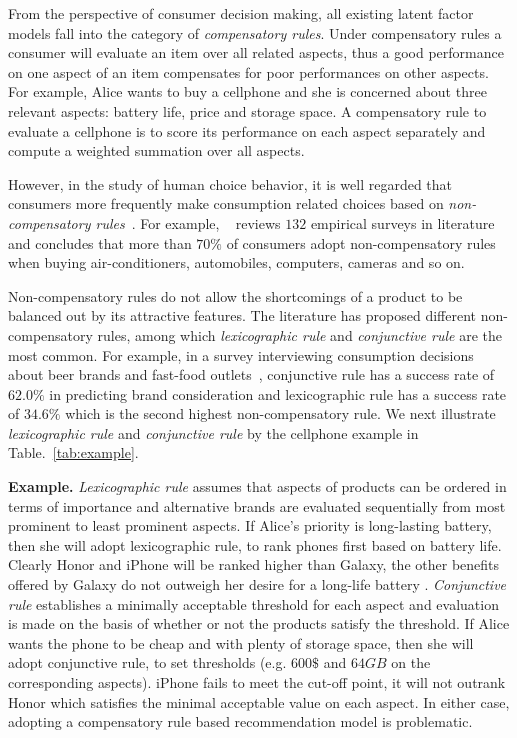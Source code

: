 \documentclass[letterpaper]{article} %
\begin{document}
From the perspective of consumer decision making, all existing latent factor models fall into the category of \emph{compensatory rules}. Under compensatory rules a consumer will evaluate an item over all related aspects, thus a good performance on one aspect of an item compensates for poor performances on other aspects. For example, Alice wants to buy a cellphone and she is concerned about three relevant aspects: battery life, price and storage space. A compensatory rule to evaluate a cellphone is to score its performance on each aspect separately and compute a weighted summation over all aspects.


However, in the study of human choice behavior, it is well regarded that consumers more frequently make consumption related choices based on \emph{non-compensatory rules}~\cite{Engel1986Consumer}. For example, ~\cite{Hauser2009Non} reviews $132$ empirical surveys in literature and  concludes that more than $70\%$ of consumers adopt non-compensatory rules when buying air-conditioners, automobiles, computers, cameras and so on. 

Non-compensatory rules do not allow the shortcomings of a product to be balanced out by its attractive features. The literature has proposed different non-compensatory rules, among which  \emph{lexicographic rule} and \emph{conjunctive rule} are the most common. For example, in a survey interviewing consumption decisions about beer brands and fast-food outlets~\cite{Laroche2003Which}, conjunctive rule has a success rate of $62.0\%$ in predicting brand consideration and lexicographic rule has a success rate of $34.6\%$ which is the second highest non-compensatory rule. We next illustrate  \emph{lexicographic rule} and \emph{conjunctive rule}  by the cellphone example in Table.~\ref{tab:example}. 

\textbf{Example.}  \emph{Lexicographic rule} assumes that aspects of products can be ordered in terms of importance and alternative brands are evaluated sequentially from most prominent to least prominent aspects.  If Alice's priority is long-lasting battery, then she will adopt lexicographic rule, to rank phones first based on battery life. Clearly Honor and iPhone will be ranked higher than Galaxy, the other benefits offered by Galaxy  do not outweigh her desire for a long-life battery . \emph{Conjunctive rule} establishes a minimally acceptable threshold for each aspect and evaluation is made on the basis of whether or not the products satisfy the threshold. If Alice wants the phone to be cheap and with plenty of storage space, then she will adopt conjunctive rule, to set thresholds (e.g. $600\$$ and $64GB$ on the corresponding aspects). iPhone fails to meet the cut-off point, it will not outrank Honor which satisfies the minimal acceptable value on each aspect. In either case, adopting a compensatory rule based recommendation model is problematic. 
\end{document}
